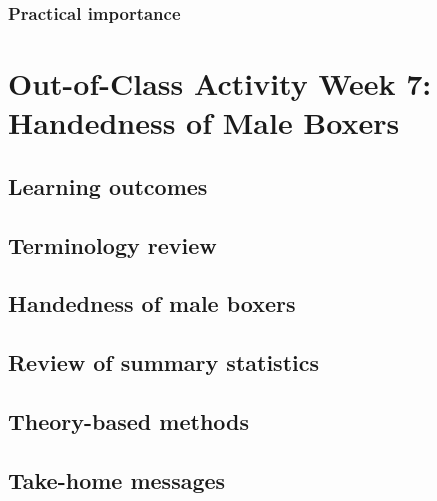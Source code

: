 \documentclass[
]{report}
\begin{document}
\hypertarget{practical-importance}{%
\subsubsection*{Practical importance}\label{practical-importance}}

\hypertarget{out-of-class-activity-week-7-handedness-of-male-boxers}{%
\section{Out-of-Class Activity Week 7: Handedness of Male Boxers}\label{out-of-class-activity-week-7-handedness-of-male-boxers}}

\hypertarget{learning-outcomes-12}{%
\subsection{Learning outcomes}\label{learning-outcomes-12}}

\hypertarget{terminology-review-10}{%
\subsection{Terminology review}\label{terminology-review-10}}

\hypertarget{handedness-of-male-boxers}{%
\subsection{Handedness of male boxers}\label{handedness-of-male-boxers}}

\hypertarget{review-of-summary-statistics}{%
\subsection*{Review of summary statistics}\label{review-of-summary-statistics}}

\hypertarget{theory-based-methods-1}{%
\subsection*{Theory-based methods}\label{theory-based-methods-1}}

\hypertarget{take-home-messages-11}{%
\subsection{Take-home messages}\label{take-home-messages-11}}
\end{document}
